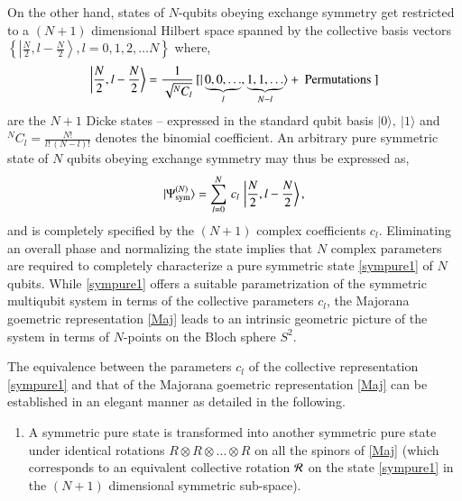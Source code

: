 {On the other hand, states of $N$-qubits obeying exchange symmetry get restricted to a $(N+1)$ dimensional Hilbert space spanned by the collective basis vectors $\left\{\left\vert \frac{N}{2}, l-\frac{N}{2}\right\rangle, l=0,1,2,\ldots N \right\}$ where,
\begin{equation}
\left\vert \frac{N}{2}, l-\frac{N}{2}\right\rangle =\frac{1}{\sqrt{^N C_l}}\,[\vert \underbrace{0, 0, \ldots}_{l}, 
\underbrace{1, 1, \ldots}_{N-l}\rangle +\ {\rm Permutations}\ ] \label{Dicke} 
\end{equation}
are the $N+1$ Dicke  states -- expressed in the standard qubit basis $\vert 0\rangle,\ \vert 1\rangle$ and $^N C_l=\frac{N!}{l!\,(N-l)!}$ denotes the binomial coefficient. An arbitrary pure symmetric state of $N$ qubits obeying exchange symmetry may thus be expressed as,    
\begin{equation}
\vert \Psi^{(N)}_{\rm sym}\rangle =\sum_{l=0}^{N}\, c_l\, \left\vert \frac{N}{2}, l-\frac{N}{2}\right\rangle,\label{sympure1}
\end{equation}
and is completely specified by the $(N+1)$ complex coefficients $c_l$.  Eliminating an overall phase and normalizing  the state  implies that $N$ complex parameters are required to completely characterize a pure symmetric state \eqref{sympure1} of $N$ qubits. While \eqref{sympure1} offers a suitable parametrization of the symmetric multiqubit system in terms of the collective parameters $c_l$, the Majorana goemetric representation \eqref{Maj} leads to an intrinsic geometric picture of the  system in terms of $N$-points on the Bloch sphere $S^2$.  

The equivalence between the parameters $c_l$ of the collective representation \eqref{sympure1} and that of  the Majorana goemetric representation \eqref{Maj} can be established in an elegant manner \cite{usa1,usa2,usa} as detailed in the following. 
\begin{enumerate}
\item A symmetric pure state is transformed into another symmetric pure state under identical rotations $R\otimes R\otimes \ldots \otimes R$ on all the spinors of \eqref{Maj} (which corresponds  to an equivalent collective rotation ${\cal R}$ on the state \eqref{sympure1} in the $(N+1)$ dimensional symmetric sub-space). 


\end{enumerate}}
